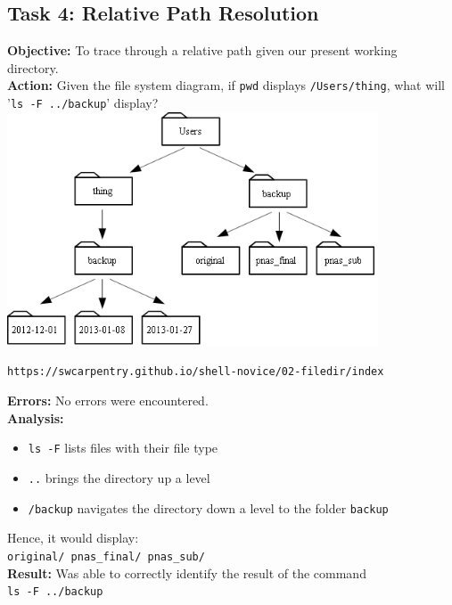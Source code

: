 \documentclass{article}
\begin{document}
\subsection{Task 4: Relative Path Resolution}
%
\textbf{Objective:} To trace through a relative path given our present working \\directory.\\
\textbf{Action:} Given the file system diagram, if \verb|pwd| displays \verb|/Users/thing|, what will '\verb|ls -F ../backup|' display?\\
\includegraphics[width=11cm]{filesystem.png}
\begin{center}
    \texttt{https://swcarpentry.github.io/shell-novice/02-filedir/index}\\
\end{center}
\textbf{Errors:} No errors were encountered.\\
\textbf{Analysis:}
\begin{itemize}
    \item \verb|ls -F| lists files with their file type
    \item \verb|..| brings the directory up a level
    \item \verb|/backup| navigates the directory down a level to the folder \verb|backup|
\end{itemize}
Hence, it would display:\\
\verb|original/ pnas_final/ pnas_sub/|\\
\textbf{Result:} Was able to correctly identify the result of the command \\\verb|ls -F ../backup|
%
\end{document}
